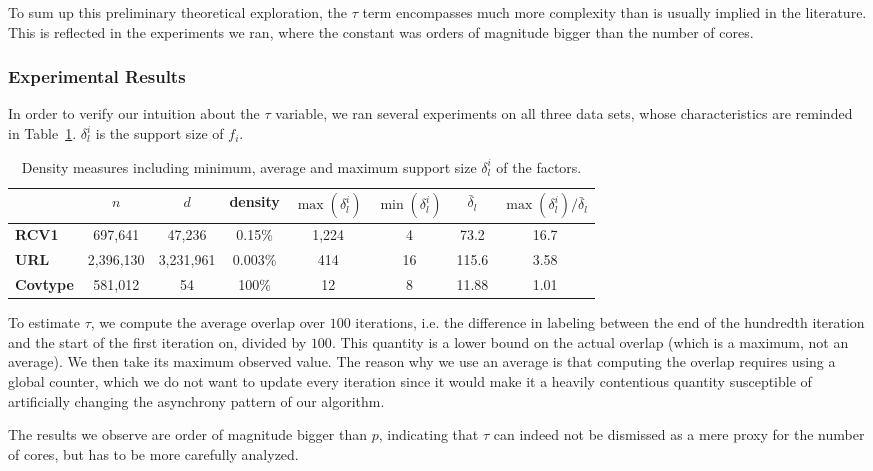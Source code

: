 \documentclass[twoside, 11pt]{article}
\newcommand{\overlap}{\tau}
\begin{document}
To sum up this preliminary theoretical exploration, the $\overlap$ term encompasses much more complexity than is usually implied in the literature.
This is reflected in the experiments we ran, where the constant was orders of magnitude bigger than the number of cores.

\subsubsection{Experimental Results}
In order to verify our intuition about the $\overlap$ variable, we ran several experiments on all three data sets, whose characteristics are reminded in Table~\ref{table:1}.
$\delta_l^i$ is the support size of $f_i$.

\begin{table}[ht]
	\caption{Density measures including minimum, average and maximum support size $\delta_l^i$ of the factors.}
	\centering
	\label{dataset-table2}
	\begin{tabular}{lccccccc}
		\toprule
		{} & $n$ & $d$ & density & $\max(\delta_l^i)$ & $\min(\delta_l^i)$ & $\bar \delta_l$ & $\max(\delta_l^i) / \bar \delta_l$\\
		\midrule
		{\bf RCV1} & \hfill 697,641 & \hfill 47,236 & \hfill 0.15\% & \hfill 1,224 & \hfill 4 & \hfill 73.2 & \hfill 16.7\\
		{\bf URL} & \hfill 2,396,130 & \hfill 3,231,961 & \hfill 0.003\% & \hfill 414 & \hfill 16 & \hfill 115.6 & \hfill 3.58 \\
		{\bf Covtype} & \hfill 581,012 & \hfill 54 & \hfill 100\% & \hfill 12 & \hfill 8 & \hfill 11.88 & \hfill 1.01 \\
		\bottomrule
	\end{tabular}
	\label{table:1}
\end{table}

To estimate $\overlap$, we compute the average overlap over $100$ iterations, i.e. the difference in labeling between the end of the hundredth iteration and the start of the first iteration on, divided by $100$.
This quantity is a lower bound on the actual overlap (which is a maximum, not an average).
We then take its maximum observed value.
The reason why we use an average is that computing the overlap requires using a global counter, which we do not want to update every iteration since it would make it a heavily contentious quantity susceptible of artificially changing the asynchrony pattern of our algorithm.

The results we observe are order of magnitude bigger than $p$, indicating that $\overlap$ can indeed not be dismissed as a mere proxy for the number of cores, but has to be more carefully analyzed.
\end{document}
